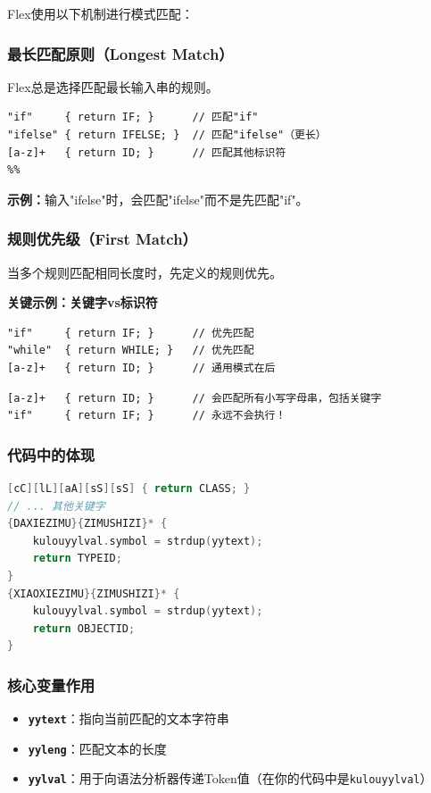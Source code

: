 \documentclass[twocolumn]{article}
\begin{document}
Flex使用以下机制进行模式匹配：

\subsubsection{最长匹配原则（Longest Match）}
Flex总是选择匹配最长输入串的规则。

\begin{lstlisting}[language=Flex, caption={最长匹配原则示例}]
%%
"if"     { return IF; }      // 匹配"if"
"ifelse" { return IFELSE; }  // 匹配"ifelse"（更长）
[a-z]+   { return ID; }      // 匹配其他标识符
%%
\end{lstlisting}

\textbf{示例：}输入"ifelse"时，会匹配"ifelse"而不是先匹配"if"。

\subsubsection{规则优先级（First Match）}
当多个规则匹配相同长度时，先定义的规则优先。

\textbf{关键示例：关键字vs标识符}

\begin{lstlisting}[language=Flex, caption={正确的规则顺序}]
"if"     { return IF; }      // 优先匹配
"while"  { return WHILE; }   // 优先匹配  
[a-z]+   { return ID; }      // 通用模式在后
\end{lstlisting}

\begin{lstlisting}[language=Flex, caption={错误的规则顺序}]
[a-z]+   { return ID; }      // 会匹配所有小写字母串，包括关键字
"if"     { return IF; }      // 永远不会执行！
\end{lstlisting}

\subsubsection{代码中的体现}
\begin{lstlisting}[language=C++, caption={代码中的模式匹配实现}]
[cC][lL][aA][sS][sS] { return CLASS; }
// ... 其他关键字
{DAXIEZIMU}{ZIMUSHIZI}* { 
    kulouyylval.symbol = strdup(yytext);
    return TYPEID;
}
{XIAOXIEZIMU}{ZIMUSHIZI}* { 
    kulouyylval.symbol = strdup(yytext);
    return OBJECTID;
}
\end{lstlisting}

\subsubsection{核心变量作用}
\begin{itemize}
    \item \textbf{\texttt{yytext}}：指向当前匹配的文本字符串
    \item \textbf{\texttt{yyleng}}：匹配文本的长度
    \item \textbf{\texttt{yylval}}：用于向语法分析器传递Token值（在你的代码中是\texttt{kulouyylval}）
\end{itemize}
\end{document}
